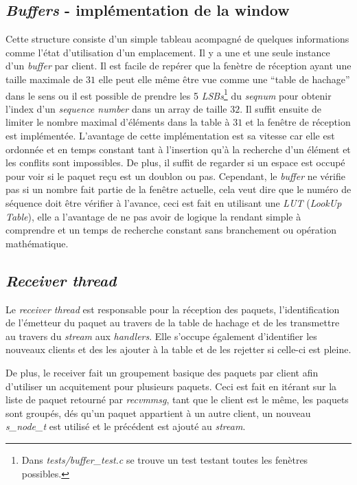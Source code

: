 \documentclass[../main.tex]{subfiles}
\begin{document}
\subsection{\textit{Buffers} - implémentation de la window}
\label{sec:buffer}

Cette structure consiste d'un simple tableau acompagné de quelques informations comme l'état d'utilisation d'un emplacement. Il y a une et une seule instance d'un \textit{buffer} par client.
Il est facile de repérer que la fenètre de réception ayant une taille maximale de $31$ elle peut elle même être vue comme une ``table de hachage'' dans le
sens ou il est possible de prendre les 5 \textit{LSBs}\footnote{ Dans \textit{tests/buffer\_test.c} se trouve un test testant toutes les fenètres possibles.} 
du \textit{seqnum} pour obtenir l'index d'un \textit{sequence number} dans un array de taille $32$. Il suffit ensuite de limiter le nombre maximal d'éléments dans la table 
à $31$ et la fenêtre de réception est implémentée. L'avantage de cette implémentation est sa vitesse car elle est ordonnée et en temps constant tant à l'insertion
qu'à la recherche d'un élément et les conflits sont impossibles. De plus, il suffit de regarder si un espace est occupé pour voir si le paquet reçu est un
doublon ou pas. Cependant, le \textit{buffer} ne vérifie pas si un nombre fait partie de la fenêtre actuelle, cela veut dire que le numéro de séquence doit
être vérifier à l'avance, ceci est fait en utilisant une \textit{LUT} (\textit{LookUp Table}), elle a l'avantage de ne pas avoir de logique la rendant simple
à comprendre et un temps de recherche constant sans branchement ou opération mathématique.

\subsection{\textit{Receiver thread}}
\label{sec:receiver}

Le \textit{receiver thread} est responsable pour la réception des paquets, l'identification de l'émetteur du paquet au travers de la table de hachage
et de les transmettre au travers du \textit{stream} aux \textit{handlers}. Elle s'occupe également d'identifier les nouveaux clients et 
des les ajouter à la table et de les rejetter si celle-ci est pleine.

De plus, le receiver fait un groupement basique des paquets par client afin d'utiliser un acquitement pour plusieurs paquets. Ceci est fait
en itérant sur la liste de paquet retourné par \textit{recvmmsg}, tant que le client est le même, les paquets sont groupés, dés qu'un paquet
appartient à un autre client, un nouveau \textit{s\_node\_t} est utilisé et le précédent est ajouté au \textit{stream}.
\end{document}
